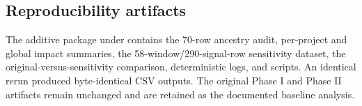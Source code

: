 \subsection{Reproducibility artifacts}
\label{sec:ancestry_artifacts}

The additive package under  contains the 70-row ancestry audit,
per-project and global impact summaries, the 58-window/290-signal-row sensitivity dataset, the original-versus-sensitivity
comparison, deterministic logs, and scripts. An identical rerun produced byte-identical CSV outputs. The original Phase I
and Phase II artifacts remain unchanged and are retained as the documented baseline analysis.
